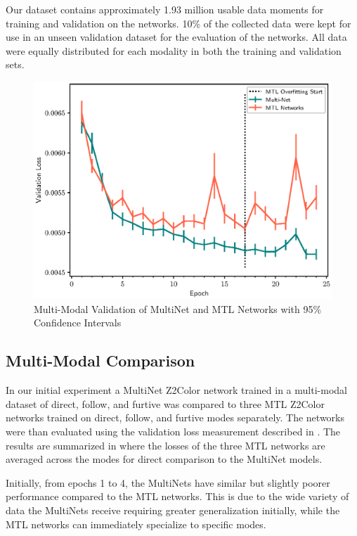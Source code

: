 Our dataset contains approximately 1.93 million usable data moments for training and validation on the networks. 10\% of the collected data were kept for use in an unseen validation dataset for the evaluation of the networks. All data were equally distributed for each modality in both the training and validation sets. 

\begin{figure}[t]
\centering
\includegraphics[width=\linewidth]{paper/content/images/mtl}
\caption{Multi-Modal Validation of MultiNet and MTL Networks with 95\% Confidence Intervals}
\label{fig:lve}
\end{figure}

\subsection{Multi-Modal Comparison}
\label{resultspt1}
In our initial experiment a MultiNet Z2Color network trained in a multi-modal dataset of direct, follow, and furtive was compared to three MTL Z2Color networks trained on direct, follow, and furtive modes separately. The networks were than evaluated using the validation loss measurement described in . The results are summarized in  where the losses of the three MTL networks are averaged across the modes for direct comparison to the MultiNet models.

Initially, from epochs 1 to 4, the MultiNets have similar but slightly poorer performance compared to the MTL networks. This is due to the wide variety of data the MultiNets receive requiring greater generalization initially, while the MTL networks can immediately specialize to specific modes.

